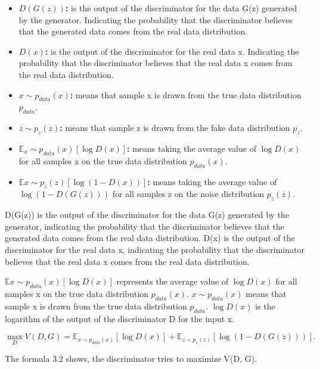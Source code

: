 \begin{itemize}
    \item \textbf{ $D(G(z))$:} is the output of the discriminator for the data G(z) generated by the generator. Indicating the probability that the discriminator believes that the generated data comes from the real data distribution.
    \item \textbf{$D(x)$:} is the output of the discriminator for the real data x. Indicating the probability that the discriminator believes that the real data x comes from the real data distribution.
    \item \textbf{ $x \sim p_{data}(x)$:} means that sample x is drawn from the true data distribution $p_{data}$.
    \item \textbf{ $z \sim p_{z}(z)$:} means that sample z is drawn from the fake data distribution $p_{z}$.
    \item \textbf{$\mathbb{E}{_x \sim p_{data}(x)}[\log D(x)]$:} means taking the average value of $\log D(x)$ for all samples x on the true data distribution $p_{data}(x)$.
    \item \textbf{$\mathbb{E}{x \sim p_{z}(z)}[\log (1 - D(x))]$:} means taking the average value of $\log (1 - D(G(z)))$ for all samples z on the noise distribution $p_z(z)$.
\end{itemize}




D(G(z)) is the output of the discriminator for the data G(z) generated by the generator, 
indicating the probability that the discriminator believes that the generated data comes from the real data distribution.
D(x) is the output of the discriminator for the real data x, 
indicating the probability that the discriminator believes that the real data x comes from the real data distribution.

$\mathbb{E}{x \sim p_{data}(x)}[\log D(x)]$ represents the average value of $\log D(x)$ for all samples x on the true data distribution $p_{data}(x)$.
$x \sim p_{data}(x)$ means that sample x is drawn from the true data distribution $p_{data}$.
$\log D(x)$ is the logarithm of the output of the discriminator D for the input x.


\begin{equation}
    \max_{D} V(D, G) = \mathbb{E}_{x \sim p_{data}(x)} [\log D(x)] + \mathbb{E}_{z \sim p_{z}(z)} [\log(1 - D(G(z)))].
\end{equation}

The formula 3.2 shows, the discriminator tries to maximize V(D, G).

